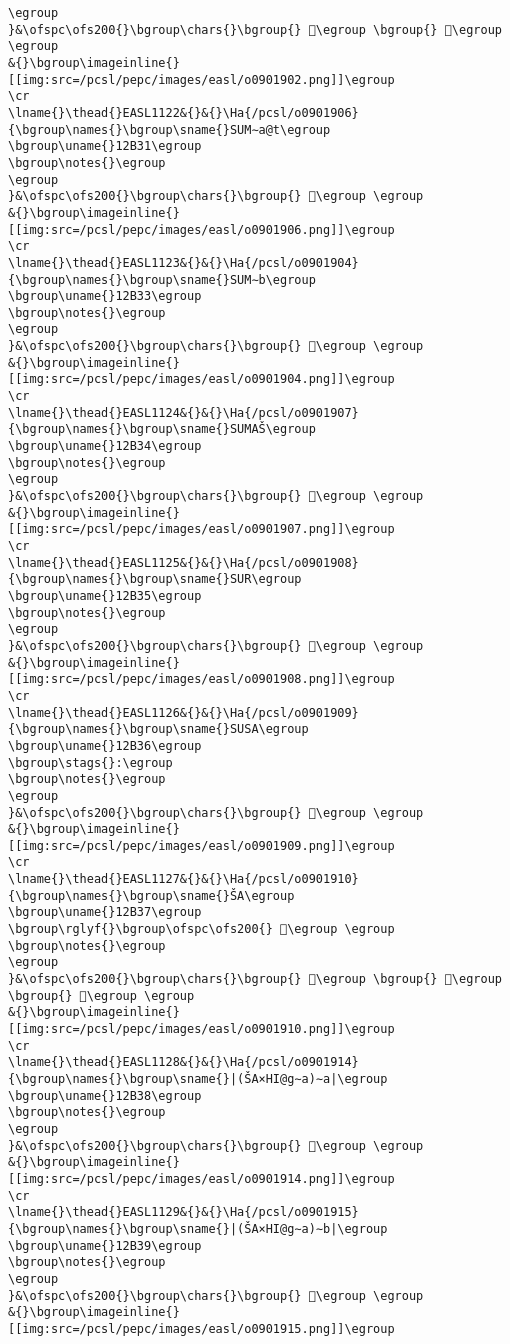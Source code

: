 \begin{verbatim}
\egroup
}&\ofspc\ofs200{}\bgroup\chars{}\bgroup{} 𒬰\egroup \bgroup{} 𒬲\egroup \egroup
&{}\bgroup\imageinline{}[[img:src=/pcsl/pepc/images/easl/o0901902.png]]\egroup
\cr
\lname{}\thead{}EASL1122&{}&{}\Ha{/pcsl/o0901906}{\bgroup\names{}\bgroup\sname{}SUM∼a@t\egroup
\bgroup\uname{}12B31\egroup
\bgroup\notes{}\egroup
\egroup
}&\ofspc\ofs200{}\bgroup\chars{}\bgroup{} 𒬱\egroup \egroup
&{}\bgroup\imageinline{}[[img:src=/pcsl/pepc/images/easl/o0901906.png]]\egroup
\cr
\lname{}\thead{}EASL1123&{}&{}\Ha{/pcsl/o0901904}{\bgroup\names{}\bgroup\sname{}SUM∼b\egroup
\bgroup\uname{}12B33\egroup
\bgroup\notes{}\egroup
\egroup
}&\ofspc\ofs200{}\bgroup\chars{}\bgroup{} 𒬳\egroup \egroup
&{}\bgroup\imageinline{}[[img:src=/pcsl/pepc/images/easl/o0901904.png]]\egroup
\cr
\lname{}\thead{}EASL1124&{}&{}\Ha{/pcsl/o0901907}{\bgroup\names{}\bgroup\sname{}SUMAŠ\egroup
\bgroup\uname{}12B34\egroup
\bgroup\notes{}\egroup
\egroup
}&\ofspc\ofs200{}\bgroup\chars{}\bgroup{} 𒬴\egroup \egroup
&{}\bgroup\imageinline{}[[img:src=/pcsl/pepc/images/easl/o0901907.png]]\egroup
\cr
\lname{}\thead{}EASL1125&{}&{}\Ha{/pcsl/o0901908}{\bgroup\names{}\bgroup\sname{}SUR\egroup
\bgroup\uname{}12B35\egroup
\bgroup\notes{}\egroup
\egroup
}&\ofspc\ofs200{}\bgroup\chars{}\bgroup{} 𒬵\egroup \egroup
&{}\bgroup\imageinline{}[[img:src=/pcsl/pepc/images/easl/o0901908.png]]\egroup
\cr
\lname{}\thead{}EASL1126&{}&{}\Ha{/pcsl/o0901909}{\bgroup\names{}\bgroup\sname{}SUSA\egroup
\bgroup\uname{}12B36\egroup
\bgroup\stags{}:\egroup
\bgroup\notes{}\egroup
\egroup
}&\ofspc\ofs200{}\bgroup\chars{}\bgroup{} 𒬶\egroup \egroup
&{}\bgroup\imageinline{}[[img:src=/pcsl/pepc/images/easl/o0901909.png]]\egroup
\cr
\lname{}\thead{}EASL1127&{}&{}\Ha{/pcsl/o0901910}{\bgroup\names{}\bgroup\sname{}ŠA\egroup
\bgroup\uname{}12B37\egroup
\bgroup\rglyf{}\bgroup\ofspc\ofs200{} 𒬷\egroup \egroup
\bgroup\notes{}\egroup
\egroup
}&\ofspc\ofs200{}\bgroup\chars{}\bgroup{} 𒬻\egroup \bgroup{} 𒬼\egroup \bgroup{} 𒬷\egroup \egroup
&{}\bgroup\imageinline{}[[img:src=/pcsl/pepc/images/easl/o0901910.png]]\egroup
\cr
\lname{}\thead{}EASL1128&{}&{}\Ha{/pcsl/o0901914}{\bgroup\names{}\bgroup\sname{}|(ŠA×HI@g∼a)∼a|\egroup
\bgroup\uname{}12B38\egroup
\bgroup\notes{}\egroup
\egroup
}&\ofspc\ofs200{}\bgroup\chars{}\bgroup{} 𒬸\egroup \egroup
&{}\bgroup\imageinline{}[[img:src=/pcsl/pepc/images/easl/o0901914.png]]\egroup
\cr
\lname{}\thead{}EASL1129&{}&{}\Ha{/pcsl/o0901915}{\bgroup\names{}\bgroup\sname{}|(ŠA×HI@g∼a)∼b|\egroup
\bgroup\uname{}12B39\egroup
\bgroup\notes{}\egroup
\egroup
}&\ofspc\ofs200{}\bgroup\chars{}\bgroup{} 𒬹\egroup \egroup
&{}\bgroup\imageinline{}[[img:src=/pcsl/pepc/images/easl/o0901915.png]]\egroup

\end{verbatim}
